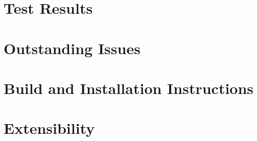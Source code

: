 \documentclass{article}
\begin{document}
\section{Test Results}

\section{Outstanding Issues} %

\section{Build and Installation Instructions}

\section{Extensibility}
\end{document}
